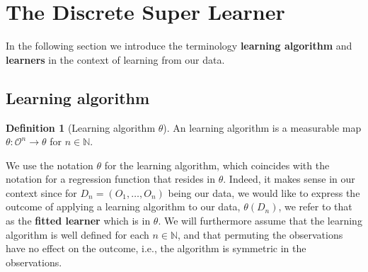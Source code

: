 \documentclass[11pt, a4paper]{article}
\theoremstyle{definition}
\newtheorem{definition}[theorem]{Definition}
\theoremstyle{remark}
\newcommand{\btheta}{\theta}
\begin{document}
\section{The Discrete Super Learner}

In the following section we introduce the terminology \textbf{learning algorithm} and \textbf{learners} in the context of learning from our data.  

\subsection{Learning algorithm}
\begin{definition}[Learning algorithm $ \btheta $]
    An learning algorithm is a measurable map $ \btheta : \mathcal{O}^{n} \to \btheta $ for $ n \in \mathbb{N} $. 
\end{definition}

We use the notation $ \btheta $ for the learning algorithm, which coincides with the notation for a regression function that resides in $ \btheta $. Indeed, it makes sense in our context since for $ D_n = (O_1 , \dots , O_n) $ being our data, we would like to express the outcome of applying a learning algorithm to our data, $\btheta(D_n) $, we refer to that as the \textbf{fitted learner} which is in $ \btheta $. We will furthermore assume that the learning algorithm is well defined for each $ n \in \mathbb{N} $, and that permuting the observations have no effect on the outcome, i.e., the algorithm is symmetric in the observations.  
\end{document}
